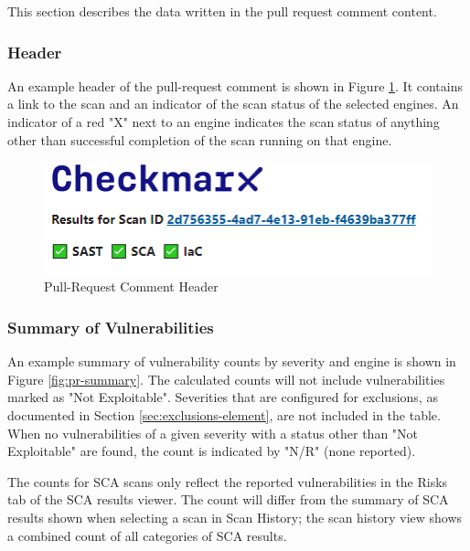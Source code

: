 This section describes the data written in the pull request comment content.


\subsubsection{Header}

An example header of the pull-request comment is shown in Figure
\ref{fig:pr-header-section}.  It contains a link to the scan
and an indicator of the scan status of the selected engines.  An indicator
of a red "X" next to an engine indicates the scan status of anything other
than successful completion of the scan running on that engine.

\begin{figure}[ht]
    \includegraphics[width=\textwidth]{graphics/pr-header.png}
    \caption{Pull-Request Comment Header}
    \label{fig:pr-header-section}
\end{figure}

\subsubsection{Summary of Vulnerabilities}

An example summary of vulnerability counts by severity and engine 
is shown in Figure \ref{fig:pr-summary}.  The calculated counts will not
include vulnerabilities marked as "Not Exploitable".  Severities that
are configured for exclusions, as documented in Section
\ref{sec:exclusions-element}, are not included in the table.  When no 
vulnerabilities of a given severity with a status other than 
"Not Exploitable" are found, the count is indicated by "N/R" (none reported).


The counts for SCA scans only reflect the reported vulnerabilities in the
Risks tab of the SCA results viewer.  The count will differ from the summary
of SCA results shown when selecting a scan in Scan History; the scan
history view shows a combined count of all categories of SCA results.

